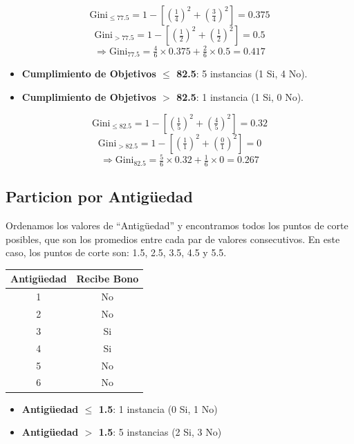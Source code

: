 \documentclass[12pt]{article}
\begin{document}
\[
  \mathrm{Gini}_{\leq 77.5} = 1 - \left[\left(\tfrac{1}{4}\right)^2 + \left(\tfrac{3}{4}\right)^2\right] = 0.375
\]
\[
  \mathrm{Gini}_{> 77.5} = 1 - \left[\left(\tfrac{1}{2}\right)^2 + \left(\tfrac{1}{2}\right)^2\right] = 0.5
\]
\[
  \Rightarrow \mathrm{Gini}_{\text{77.5}} = \tfrac{4}{6}\times0.375 + \tfrac{2}{6}\times0.5 = 0.417
\]

\begin{itemize}
  \item \textbf{Cumplimiento de Objetivos $\leq$ 82.5}: 5 instancias (1 Si, 4 No).
  \item \textbf{Cumplimiento de Objetivos $>$ 82.5}: 1 instancia (1 Si, 0 No).
\end{itemize}

\[
  \mathrm{Gini}_{\leq 82.5} = 1 - \left[\left(\tfrac{1}{5}\right)^2 + \left(\tfrac{4}{5}\right)^2\right] = 0.32
\]
\[
  \mathrm{Gini}_{> 82.5} = 1 - \left[\left(\tfrac{1}{1}\right)^2 + \left(\tfrac{0}{1}\right)^2\right] = 0
\]
\[
  \Rightarrow \mathrm{Gini}_{\text{82.5}} = \tfrac{5}{6}\times0.32 + \tfrac{1}{6}\times0 = 0.267
\]

\subsection{Particion por Antigüedad}

Ordenamos los valores de ``Antigüedad'' y encontramos todos los puntos de corte posibles, que son los promedios entre cada par de valores consecutivos. En este caso, los puntos de corte son: 1.5, 2.5, 3.5, 4.5 y 5.5.

\begin{table}[h]
  \centering
  \begin{tabular}{cc}
    \toprule
    Antigüedad & Recibe Bono \\
    \midrule
    1 & No \\
    2 & No \\
    3 & Si \\
    4 & Si \\
    5 & No \\
    6 & No \\
    \bottomrule
  \end{tabular}
\end{table}

\begin{itemize}
  \item \textbf{Antigüedad $\leq$ 1.5}: 1 instancia (0 Si, 1 No)
  \item \textbf{Antigüedad $>$ 1.5}: 5 instancias (2 Si, 3 No)
\end{itemize}
\end{document}
